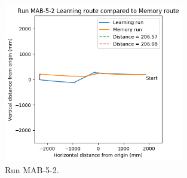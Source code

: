 \documentclass[a4paper,11pt,twoside,openright]{article}
\begin{document}
\begin{figure}[h!]
 \centering
  \includegraphics[width=0.7\textwidth]{MAB-5-2}
  \caption{
    \label{fig:mab-5-2} Run MAB-5-2.
  }
\end{figure}
\end{document}
